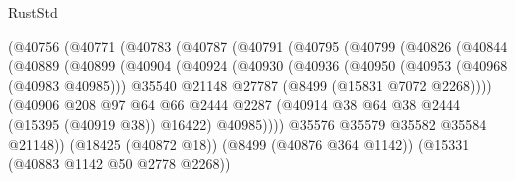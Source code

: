 \begin{lexlean}{RustStd}
\begin{coremodule}
                          (@40756
                            (@40771
                              (@40783
                                (@40787
                                  (@40791
                                    (@40795
                                      (@40799
                                        (@40826
                                          (@40844
                                            (@40889
                                              (@40899
                                                (@40904
                                                  (@40924
                                                    (@40930
                                                      (@40936
                                                        (@40950
                                                          (@40953 (@40968 (@40983 @40985)))
                                                          @35540
                                                          @21148
                                                          @27787
                                                          (@8499 (@15831 @7072 @2268))))
                                                      (@40906
                                                        @208
                                                        @97
                                                        @64
                                                        @66
                                                        @2444
                                                        @2287
                                                        (@40914
                                                          @38
                                                          @64
                                                          @38
                                                          @2444
                                                          (@15395 (@40919 @38))
                                                          @16422)
                                                        @40985))))
                                                @35576
                                                @35579
                                                @35582
                                                @35584
                                                @21148))
                                            (@18425 (@40872 @18))
                                            (@8499 (@40876 @364 @1142))
                                            (@15331 (@40883 @1142 @50 @2778 @2268))

\end{coremodule}
\end{lexlean}
